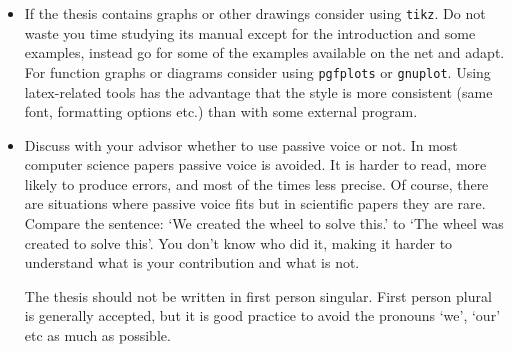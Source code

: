 \begin{itemize}
      \item If the thesis contains graphs or other drawings consider
        using \texttt{tikz}. Do not waste you time studying its manual
        except for the introduction and some examples, instead go for
        some of the examples available on the net and adapt. For
        function graphs or diagrams consider using \texttt{pgfplots}
        or \texttt{gnuplot}.  Using latex-related tools has the
        advantage that the style is more consistent (same font,
        formatting options etc.) than with some external program.

      \item Discuss with your advisor whether to use passive voice or
        not. In most computer science papers passive voice is
        avoided. It is harder to read, more likely to produce errors,
        and most of the times less precise. Of course, there are
        situations where passive voice fits but in scientific papers
        they are rare. Compare the sentence: `We created the wheel to
        solve this.' to `The wheel was created to solve this'.  You
        don't know who did it, making it harder to understand what is
        your contribution and what is not.

        The thesis should not be written in first person singular. First person plural is generally accepted, but it is good practice to avoid the pronouns `we', `our' etc as much as possible.

    \end{itemize}
